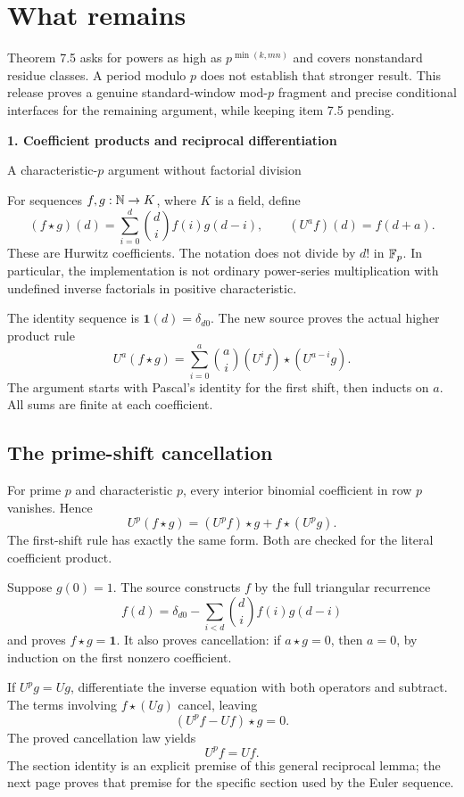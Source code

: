 \documentclass[11pt]{article}
\newcommand{\pageheading}[2]{{\Large\bfseries\color{ink}#1}\par{\small #2}\par\medskip}
\begin{document}
\section*{What remains}
Theorem 7.5 asks for powers as high as $p^{\min(k,mn)}$ and covers nonstandard residue classes. A period modulo $p$ does not establish that stronger result. This release proves a genuine standard-window mod-$p$ fragment and precise conditional interfaces for the remaining argument, while keeping item 7.5 pending.

\newpage
\pageheading{1. Coefficient products and reciprocal differentiation}{A characteristic-$p$ argument without factorial division}
For sequences $f,g:\mathbb N\to K$, where $K$ is a field, define
\[
 (f\star g)(d)=\sum_{i=0}^{d}\binom di f(i)g(d-i),
 \qquad (U^a f)(d)=f(d+a).
\]
These are Hurwitz coefficients. The notation does not divide by $d!$ in $\mathbb F_p$. In particular, the implementation is not ordinary power-series multiplication with undefined inverse factorials in positive characteristic.

The identity sequence is $\mathbf1(d)=\delta_{d0}$. The new source proves the actual higher product rule
\[
 U^a(f\star g)=\sum_{i=0}^{a}\binom ai
       (U^i f)\star(U^{a-i}g).
\]
The argument starts with Pascal's identity for the first shift, then inducts on $a$. All sums are finite at each coefficient.

\subsection*{The prime-shift cancellation}
For prime $p$ and characteristic $p$, every interior binomial coefficient in row $p$ vanishes. Hence
\[
 U^p(f\star g)=(U^pf)\star g+f\star(U^pg).
\]
The first-shift rule has exactly the same form. Both are checked for the literal coefficient product.

Suppose $g(0)=1$. The source constructs $f$ by the full triangular recurrence
\[
 f(d)=\delta_{d0}-\sum_{i<d}\binom di f(i)g(d-i)
\]
and proves $f\star g=\mathbf1$. It also proves cancellation: if $a\star g=0$, then $a=0$, by induction on the first nonzero coefficient.

If $U^pg=Ug$, differentiate the inverse equation with both operators and subtract. The terms involving $f\star(Ug)$ cancel, leaving
\[
 (U^pf-Uf)\star g=0.
\]
The proved cancellation law yields
\[
 \boxed{U^pf=Uf.}
\]
The section identity is an explicit premise of this general reciprocal lemma; the next page proves that premise for the specific section used by the Euler sequence.
\end{document}
